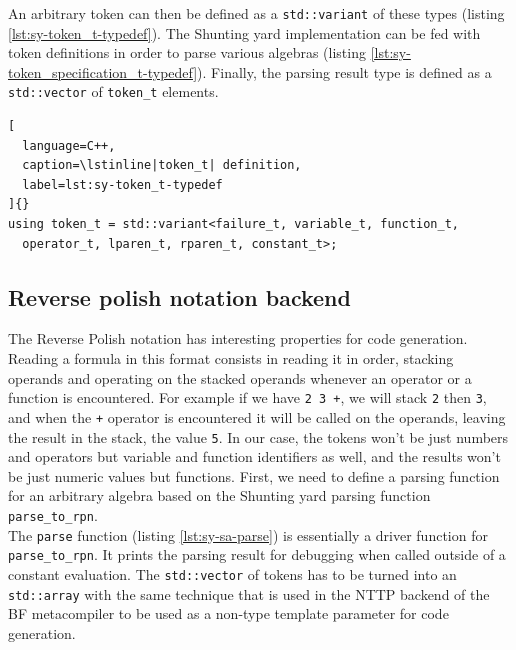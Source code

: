 \documentclass[../../main.tex]{subfiles}
\begin{document}
An arbitrary token can then be defined as a \lstinline|std::variant| of these
types (listing \ref{lst:sy-token_t-typedef}). The Shunting yard implementation
can be fed with token definitions in order to parse various algebras
(listing \ref{lst:sy-token_specification_t-typedef}). Finally, the parsing result
type is defined as a \lstinline|std::vector| of \lstinline|token_t| elements.

\begin{lstlisting}[
  language=C++,
  caption=\lstinline|token_t| definition,
  label=lst:sy-token_t-typedef
]{}
using token_t = std::variant<failure_t, variable_t, function_t,
  operator_t, lparen_t, rparen_t, constant_t>;
\end{lstlisting}



\subsection{Reverse polish notation backend}

The Reverse Polish notation has interesting properties for code generation.
Reading a formula in this format consists in reading it in order, stacking
operands and operating on the stacked operands whenever an operator or a
function is encountered. For example if we have \lstinline|2 3 +|, we will stack
\lstinline|2| then \lstinline|3|, and when the \lstinline|+| operator is
encountered it will be called on the operands, leaving the result in the stack,
\ie the value \lstinline|5|.
In our case, the tokens won't be just numbers and operators but variable and
function identifiers as well, and the results won't be just numeric values but
functions. First, we need to define a \constexpr parsing function for an
arbitrary algebra based on the \constexpr Shunting yard parsing function
\ie \lstinline|parse_to_rpn|.\\

The \lstinline|parse| function (listing \ref{lst:sy-sa-parse}) is
essentially a driver function for \lstinline|parse_to_rpn|. It prints the
parsing result for debugging when called outside of a constant evaluation.
The \lstinline|std::vector| of tokens has to be turned into an
\lstinline|std::array| with the same technique that is used in the NTTP backend
of the BF metacompiler to be used as a non-type template parameter for code
generation.\\
\end{document}
